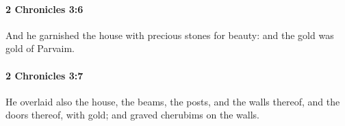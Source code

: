 		\paragraph{2 Chronicles 3:6} %
			\label{2CHRONICLES-3-6}

			And he garnished the house with precious stones for beauty: and the gold was gold of Parvaim.


		\paragraph{2 Chronicles 3:7} %
			\label{2CHRONICLES-3-7}

			He overlaid also the house, the beams, the posts, and the walls thereof, and the doors thereof, with gold; and graved cherubims on the walls.


